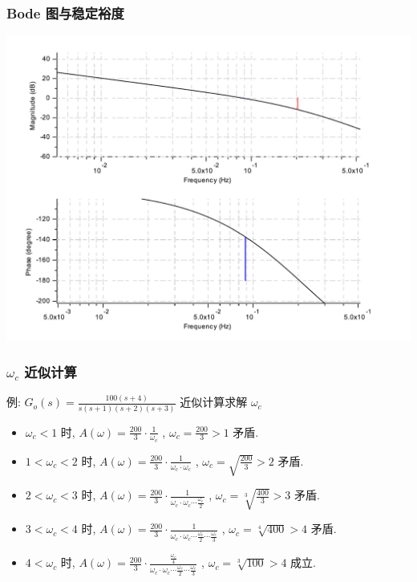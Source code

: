 \documentclass[table]{beamer}
\begin{document}
\subsubsection{Bode 图与稳定裕度}
\label{sec:orgd60acb3}
\begin{center}
\includegraphics[width=.9\linewidth]{image/margin_bode_scilab.pdf}
\end{center}

\subsubsection{\(\omega_c\) 近似计算}
\label{sec:org1698236}
例: \(G_o(s)=\frac{100(s+4)}{s(s+1)(s+2)(s+3)}\) 近似计算求解 \(\omega_c\) 
\begin{itemize}
\item <3->\(\omega_c<1\)   时, \(A(\omega)=\frac{200}{3}\cdot\frac{1}{\omega_c}\) , \(\omega_c=\frac{200}{3}>1\) 矛盾.
\item <4->\(1<\omega_c<2\) 时, \(A(\omega)=\frac{200}{3}\cdot\frac{1}{\omega_c\cdot\omega_c}\) , \(\omega_c=\sqrt{\frac{200}{3}}>2\) 矛盾.
\item <5->\(2<\omega_c<3\) 时, \(A(\omega)=\frac{200}{3}\cdot\frac{1}{\omega_c\cdot\omega_c\cdots\frac{\omega_c}{2}}\) , \(\omega_c=\sqrt[3]{\frac{400}{3}}>3\) 矛盾.
\item <6->\(3<\omega_c<4\) 时, \(A(\omega)=\frac{200}{3}\cdot\frac{1}{\omega_c\cdot\omega_c\cdots\frac{\omega_c}{2}\cdots\frac{\omega_c}{3}}\) , \(\omega_c=\sqrt[4]{400}>4\) 矛盾.
\item <7->\(4<\omega_c\) 时, \(A(\omega)=\frac{200}{3}\cdot\frac{\frac{\omega_c}{4}}{\omega_c\cdot\omega_c\cdots\frac{\omega_c}{2}\cdots\frac{\omega_c}{3}}\) , \(\omega_c=\sqrt[3]{100}>4\) 成立.
\end{itemize}
\end{document}
